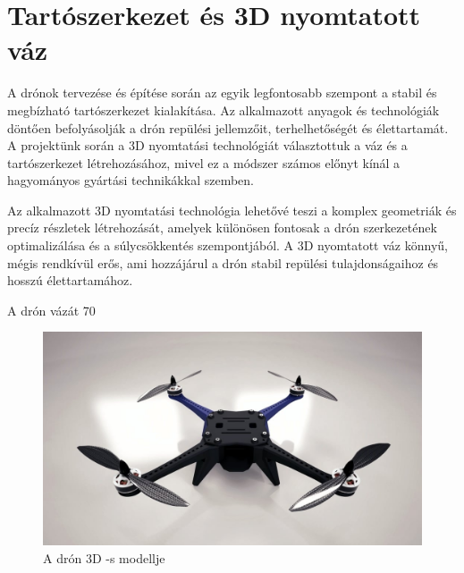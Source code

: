 \section{Tartószerkezet és 3D nyomtatott váz}

A drónok tervezése és építése során az egyik legfontosabb szempont a stabil és megbízható tartószerkezet kialakítása. Az alkalmazott anyagok és technológiák döntően befolyásolják a drón repülési jellemzőit, terhelhetőségét és élettartamát. A projektünk során a 3D nyomtatási technológiát választottuk a váz és a tartószerkezet létrehozásához, mivel ez a módszer számos előnyt kínál a hagyományos gyártási technikákkal szemben.

Az alkalmazott 3D nyomtatási technológia lehetővé teszi a komplex geometriák és precíz részletek létrehozását, amelyek különösen fontosak a drón szerkezetének optimalizálása és a súlycsökkentés szempontjából. A 3D nyomtatott váz könnyű, mégis rendkívül erős, ami hozzájárul a drón stabil repülési tulajdonságaihoz és hosszú élettartamához.

A drón vázát 70%

\begin{figure}[H]
	\centering
	\includegraphics[scale=0.3]{figures/drone_model.JPG}
	\caption{A drón 3D -s modellje}
	\label{A drón 3D -s modellje}
\end{figure}

